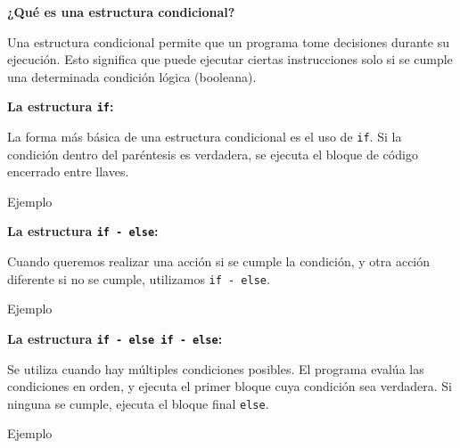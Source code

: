 \documentclass{article}
\newcommand{\cppfile}[2][]{
    \begin{container}{\faCode \space \space  #1}
        
    \end{container}
}
\begin{document}
\textbf{¿Qué es una estructura condicional?}

Una estructura condicional permite que un programa tome decisiones durante su ejecución. Esto significa que puede ejecutar ciertas instrucciones solo si se cumple una determinada condición lógica (booleana).

\vspace{0.5em}
\textbf{La estructura \texttt{if}:}

La forma más básica de una estructura condicional es el uso de \texttt{if}. Si la condición dentro del paréntesis es verdadera, se ejecuta el bloque de código encerrado entre llaves.

\cppfile[Ejemplo]{codes/condicional_if.cpp}

\vspace{0.5em}
\textbf{La estructura \texttt{if - else}:}

Cuando queremos realizar una acción si se cumple la condición, y otra acción diferente si no se cumple, utilizamos \texttt{if - else}.

\cppfile[Ejemplo]{codes/condicional_if_else.cpp}

\vspace{0.5em}
\textbf{La estructura \texttt{if - else if - else}:}

Se utiliza cuando hay múltiples condiciones posibles. El programa evalúa las condiciones en orden, y ejecuta el primer bloque cuya condición sea verdadera. Si ninguna se cumple, ejecuta el bloque final \texttt{else}.

\cppfile[Ejemplo]{codes/condicional_if_elseif_else.cpp}

\vspace{0.5em}
\end{document}
